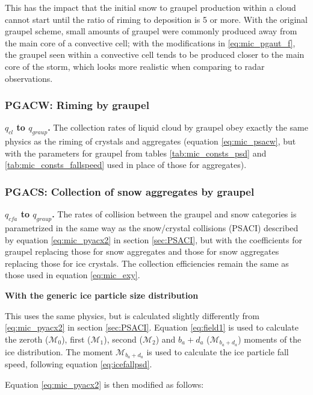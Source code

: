 \documentclass{UMDP_article}
\begin{document}
This has the impact that the initial snow to graupel production within a cloud cannot 
start until the ratio of riming to deposition is 5 or more. With the original graupel
scheme, small amounts of graupel were commonly produced away from the main core of a 
convective cell; with the modifications in \ref{eq:mic_pgaut_f}, the graupel seen 
within a convective cell tends to be produced closer to the main core of the storm,
which looks more realistic when comparing to radar observations. 

\subsubsection{PGACW: Riming by graupel}
\label{sec:PGACW}

\textbf{$q_{cl}$ to $q_{graup}$.}
The collection rates of liquid cloud by graupel obey exactly the same physics as 
the riming of crystals and aggregates (equation \ref{eq:mic_psacw}, but with
the parameters for graupel from tables \ref{tab:mic_consts_psd} and
\ref{tab:mic_consts_fallspeed} used in place of those for aggregates).  

\subsubsection{PGACS: Collection of snow aggregates by graupel}
\label{sec:PGACS}

\textbf{$q_{cfa}$ to $q_{graup}$.}
The rates of collision between the graupel and snow categories is parametrized
in the same way as the snow/crystal collisions (PSACI) described by equation
\ref{eq:mic_pyacx2} in section \ref{sec:PSACI}, but with the coefficients for 
graupel replacing those for snow aggregates and those for snow aggregates replacing 
those for ice crystals. The collection efficiencies remain the same as those 
used in equation \ref{eq:mic_exy}.

\textbf{With the generic ice particle size distribution}

This uses the same physics, but is calculated slightly differently from 
\ref{eq:mic_pyacx2} in section \ref{sec:PSACI}. Equation \ref{eq:field1}
is used to calculate the zeroth ($\mathcal{M}_0$), first ($\mathcal{M}_1$), 
second ($\mathcal{M}_2$) and $b_a+d_a$ ($\mathcal{M}_{b_a+d_a}$) moments
of the ice distribution. The moment $\mathcal{M}_{b_a+d_a}$ is used to 
calculate the ice particle fall speed, following equation 
\ref{eq:icefallpsd}. 

Equation \ref{eq:mic_pyacx2} is then modified as follows:
\end{document}
